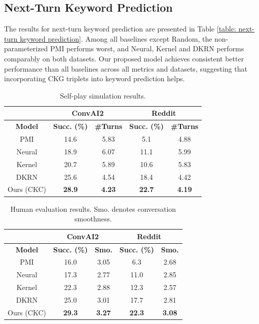 \documentclass[letterpaper]{article} %
\begin{document}
\subsection{Next-Turn Keyword Prediction}
\label{sec: next-turn keyword prediction}

The results for next-turn keyword prediction are presented in Table \ref{table: next-turn keyword prediction}. Among all baselines except Random, the non-parameterized PMI performs worst, and Neural, Kernel and DKRN performs comparably on both datasets. Our proposed model achieves consistent better performance than all baselines across all metrics and datasets, suggesting that incorporating CKG triplets into keyword prediction helps.
\begin{table}[!t]
\small
\centering
\begin{tabular}{c|cc|cc}
\hline
&\multicolumn{2}{c|}{\textbf{ConvAI2}}&\multicolumn{2}{c}{\textbf{Reddit}}\\
\hline
\textbf{Model} & \textbf{Succ. (\%)} & \textbf{\#Turns} & \textbf{Succ. (\%)} & \textbf{\#Turns}\\
\hline
PMI & 14.6 & 5.83 & 5.1 & 4.88\\
Neural & 18.9 & 6.07 & 11.1 & 5.99\\
Kernel & 20.7 & 5.89 & 10.6 & 5.83\\
DKRN & 25.6 & 4.54 & 18.4 & 4.42\\
\hline
Ours (CKC) & \textbf{28.9} & \textbf{4.23} & \textbf{22.7} & \textbf{4.19}\\
\hline
\end{tabular}
\caption{Self-play simulation results.}
\label{table: self-play}
\end{table}
\begin{table}[!t]
\small
\centering
\begin{tabular}{c|cc|cc}
\hline
&\multicolumn{2}{c|}{\textbf{ConvAI2}}&\multicolumn{2}{c}{\textbf{Reddit}}\\
\hline
\textbf{Model} & \textbf{Succ. (\%)} & \textbf{Smo.} & \textbf{Succ. (\%)} & \textbf{Smo.}\\
\hline
PMI & 16.0 & 3.05 & 6.3 & 2.68\\
Neural & 17.3 & 2.77 & 11.0 & 2.85\\
Kernel & 22.3 & 2.88 & 12.3 & 2.57\\
DKRN & 25.0 & 3.01 & 17.7 & 2.81\\
\hline
Ours (CKC) & \textbf{29.3} & \textbf{3.27} & \textbf{22.3} & \textbf{3.08}\\
\hline
\end{tabular}
\caption{Human evaluation results. Smo. denotes conversation smoothness.}
\label{table: human evaluation}
\end{table}
\end{document}
